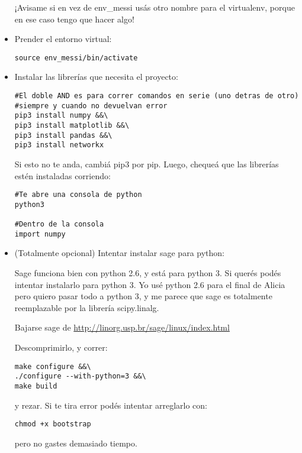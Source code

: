 \documentclass[10pt,a4paper]{report}
\begin{document}
\begin{itemize}
¡Avisame si en vez de env\_messi usás otro nombre para el virtualenv, porque en ese caso tengo que hacer algo!

\item Prender el entorno virtual:

\begin{lstlisting}
source env_messi/bin/activate
\end{lstlisting}

\item Instalar las librerías que necesita el proyecto:

\begin{lstlisting}
#El doble AND es para correr comandos en serie (uno detras de otro)
#siempre y cuando no devuelvan error
pip3 install numpy &&\
pip3 install matplotlib &&\
pip3 install pandas &&\
pip3 install networkx
\end{lstlisting}

Si esto no te anda, cambiá pip3 por pip. Luego, chequeá que las librerías estén instaladas corriendo:

\begin{lstlisting}
#Te abre una consola de python
python3

#Dentro de la consola
import numpy
\end{lstlisting}



\item (Totalmente opcional) Intentar instalar sage para python:


Sage funciona bien con python 2.6, y está  para python 3. Si querés podés intentar instalarlo para python 3. Yo usé python 2.6 para el final de Alicia pero quiero pasar todo a python 3, y me parece que sage es totalmente reemplazable por la librería scipy.linalg.

Bajarse sage de \url{http://linorg.usp.br/sage/linux/index.html}

Descomprimirlo, y correr:

\begin{lstlisting}
make configure &&\
./configure --with-python=3 &&\
make build
\end{lstlisting}

y rezar. Si te tira error  podés intentar arreglarlo con:

\begin{lstlisting}
chmod +x bootstrap
\end{lstlisting}

pero no gastes demasiado tiempo.

\end{itemize}
\end{document}
